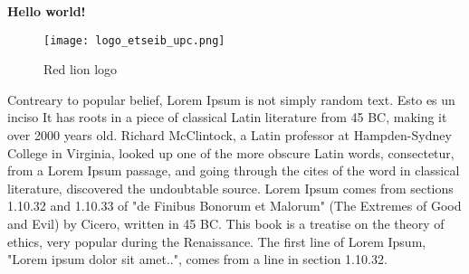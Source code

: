 \documentclass[../main.tex]{subfiles}
\begin{document}
\textbf{Hello world!}

\begin{figure}[bh]
\centering
\texttt{[image: logo\_etseib\_upc.png]}

\label{fig:img2}
\caption{Red lion logo}
\end{figure}

Contreary to popular belief, Lorem Ipsum is not simply random text. Esto es un inciso It has roots in a piece of classical Latin literature from 45 BC, making it over 2000 years old. Richard McClintock, a Latin professor at Hampden-Sydney College in Virginia, looked up one of the more obscure Latin words, consectetur, from a Lorem Ipsum passage, and going through the cites of the word in classical literature, discovered the undoubtable source. Lorem Ipsum comes from sections 1.10.32 and 1.10.33 of "de Finibus Bonorum et Malorum" (The Extremes of Good and Evil) by Cicero, written in 45 BC. This book is a treatise on the theory of ethics, very popular during the Renaissance. The first line of Lorem Ipsum, "Lorem ipsum dolor sit amet..", comes from a line in section 1.10.32.
 
\end{document}
